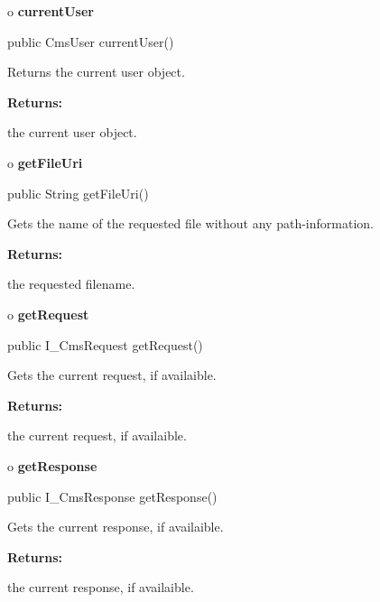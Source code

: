 o {\bf currentUser} 

\begin{PRE}
 public CmsUser currentUser()
\end{PRE}

\begin{description}
\htmlDD Returns the current user object. 

\begin{description}
\item {\bf Returns:}  

the current user object.  
\end{description}

\end{description}

o {\bf getFileUri} 

\begin{PRE}
 public String getFileUri()
\end{PRE}

\begin{description}
\htmlDD Gets the name of the requested file without any path-information. 

\begin{description}
\item {\bf Returns:}  

the requested filename.  
\end{description}

\end{description}

o {\bf getRequest} 

\begin{PRE}
 public I\_CmsRequest getRequest()
\end{PRE}

\begin{description}
\htmlDD Gets the current request, if availaible. 

\begin{description}
\item {\bf Returns:}  

the current request, if availaible.  
\end{description}

\end{description}

o {\bf getResponse} 

\begin{PRE}
 public I\_CmsResponse getResponse()
\end{PRE}

\begin{description}
\htmlDD Gets the current response, if availaible. 

\begin{description}
\item {\bf Returns:}  

the current response, if availaible.  
\end{description}

\end{description}

